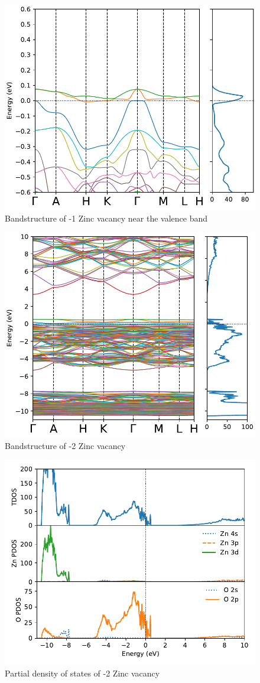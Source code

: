 \begin{figure}[tbh!]
	\centering
	\includegraphics[width=0.6\linewidth]{"images/rnd/band-dos-close_Zn_vac-n1"}
	\caption[Bandstructure of -1 Zinc vacancy near the valence band]{Bandstructure of -1 Zinc vacancy near the valence band}
	\label{fig:band-dos-close_Zn_vac-n1}
\end{figure}

\begin{figure}[tbh!]
	\centering
	\includegraphics[width=0.6\linewidth]{"images/rnd/band-dos_Zn_vac-n2"}
	\caption[Bandstructure of -2 Zinc vacancy]{Bandstructure of -2 Zinc vacancy}
	\label{fig:band-dos_Zn_vac-n2}
\end{figure}

\begin{figure}[tbh!]
	\centering
	\includegraphics[width=0.6\linewidth]{"images/rnd/dos-pdos_Zn_vac-n2"}
	\caption[Partial density of states of -2 Zinc vacancy]{Partial density of states of -2 Zinc vacancy}
	\label{fig:dos-pdos_Zn_vac-n2}
\end{figure}

